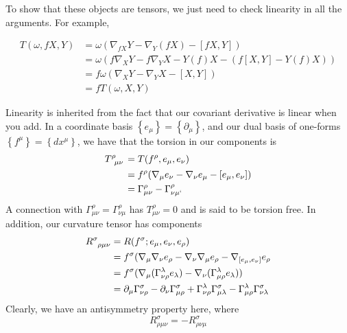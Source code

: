 \documentclass[11pt, a4paper]{article}   	%
\theoremstyle{slplain}
\begin{document}
To show that these objects are tensors, 
we just need to check linearity in all the arguments. 
For example, 

\begin{align*}
	T ( \omega , fX, Y ) &=  \omega ( \nabla _{ f X  } Y - \nabla _ Y ( f X) - [ fX , Y ] )  \\
			     &=  \omega ( f \nabla _ X Y - f \nabla _ Y X - Y ( f) X  - ( f [ X, Y ] - Y ( f ) X ) ) \\
			     &=  f \omega ( \nabla _ X Y - \nabla _ Y X   - [ X , Y ] )   \\
			     &=  f T ( \omega , X, Y ) 
\end{align*}

Linearity is inherited from the fact 
that our covariant derivative is linear when you add. 
In a coordinate basis $ \left\{  e _\mu   \right\}  = \left\{  \partial  _ \mu  \right\}  $, 
and our dual basis of one-forms $ \left\{  f^ \mu \right\}  = \left\{  dx ^ \mu \right\} $, 
we have that the torsion in our components 
is 
\begin{align*}
	T \indices{ ^ \rho _{ \mu \nu } } &=  T ( f ^ \rho, e_ \mu , e _ \nu )  \\
					  &=  f^ \rho ( \nabla _ \mu e _ \nu - \nabla _ \nu e_\mu  - [ e_ \mu , e _ \nu ] )   \\
	&=  \Gamma^ \rho_{ \mu \nu }  - \Gamma ^ \rho _{ \nu \mu ` } 
\end{align*}
A connection with $ \Gamma^ \rho _{ \mu \nu }  = \Gamma ^ \rho _{ \nu \mu } $
has $ T ^ \rho _{ \mu \nu }  = 0 $ and is said to 
be torsion free. 
In addition, our curvature tensor has components 
\begin{align*}
	R \indices{ ^ \sigma _{ \rho \mu \nu }} &=  R ( f ^ \sigma; e_ \mu , e_ \nu , e _ \rho )  \\
						&=  f ^ \sigma ( \nabla _ \mu \nabla _ \nu e _ \rho - 
						\nabla _ \nu \nabla _ \mu e _ \rho 
						- \nabla _{ [ e_ \mu , e _ \nu ] } e _ \rho \\
						&=  f ^ \sigma ( \nabla _ \mu ( \Gamma ^ \lambda _{ \nu \rho } e_{ \lambda } )  - \nabla _ \nu ( \Gamma ^ \lambda _{ \mu \rho } e_{ \lambda  } ) )   \\
						&=  \partial _ \mu \Gamma ^ \sigma _{ \nu \rho } - \partial  _ \nu \Gamma ^ \sigma _{ \mu \rho } + \Gamma ^ \lambda _{ \nu \rho } \Gamma^ \sigma _{ \mu \lambda } 
						 - \Gamma^ \lambda_{ \mu \rho } \Gamma ^ \sigma _{ \nu  \lambda }
\end{align*}
Clearly, we have an antisymmetry property here, 
where \[
 R ^ \sigma _{ \rho \mu \nu } =  - R ^ \sigma _{ \rho \nu \mu } 
\]
\end{document}
